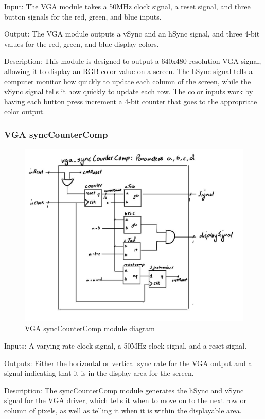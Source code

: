 \documentclass[a4paper]{article}
\begin{document}
Input: The VGA module takes a 50MHz clock signal, a reset signal, and three button signals for the red, green, and blue inputs.

Output: The VGA module outputs a vSync and an hSync signal, and three 4-bit values for the red, green, and blue display colors.

Description: This module is designed to output a 640x480 resolution VGA signal, allowing it to display an RGB color value on a screen. The hSync signal tells a computer monitor how quickly to update each column of the screen, while the vSync signal tells it how quickly to update each row. The color inputs work by having each button press increment a 4-bit counter that goes to the appropriate color output.

\subsubsection{VGA syncCounterComp}

\begin{figure}[H]
    \includegraphics[width=0.8 \linewidth]{images/vgasyncCounterComp.JPG}
    \caption{VGA syncCounterComp module diagram}
    \label{vgaSyncCounterCompDiagram}
\end{figure}

Inputs: A varying-rate clock signal, a 50MHz clock signal, and a reset signal.

Outputs: Either the horizontal or vertical sync rate for the VGA output and a signal indicating that it is in the display area for the screen.

Description: The syncCounterComp module generates the hSync and vSync signal for the VGA driver, which tells it when to move on to the next row or column of pixels, as well as telling it when it is within the displayable area.
\end{document}

